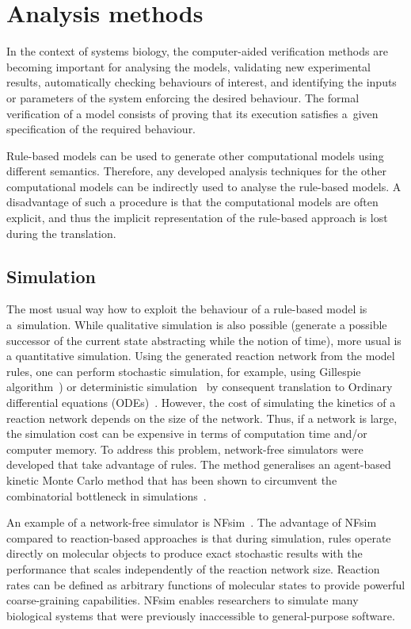 \documentclass[11pt,a4paper]{report}
\begin{document}
\section{Analysis methods}\label{analysis_sec}

In the context of systems biology, the computer-aided verification methods are becoming important for analysing the models, validating new experimental results, automatically checking behaviours of interest, and identifying the inputs or parameters of the system enforcing the desired behaviour. The formal verification of a model consists of proving that its execution satisfies a~given specification of the required behaviour.

Rule-based models can be used to generate other computational models using different semantics. Therefore, any developed analysis techniques for the other computational models can be indirectly used to analyse the rule-based models. A disadvantage of such a procedure is that the computational models are often explicit, and thus the implicit representation of the rule-based approach is lost during the translation. 

\subsection{Simulation}

The most usual way how to exploit the behaviour of a rule-based model is a~simulation. While qualitative simulation is also possible (generate a possible successor of the current state abstracting while the notion of time), more usual is a quantitative simulation. Using the generated reaction network from the model rules, one can perform stochastic simulation, for example, using Gillespie algorithm~\cite{GILLESPIE1976403}) or deterministic simulation~\cite{Poole2000} by consequent translation to Ordinary differential equations (ODEs)~\cite{higham2008modeling}. However, the cost of simulating the kinetics of a reaction network depends on the size of the network. Thus, if a network is large, the simulation cost can be expensive in terms of computation time and/or computer memory. To address this problem, network-free simulators were developed that take advantage of rules. The method generalises an agent-based kinetic Monte Carlo method that has been shown to circumvent the combinatorial bottleneck in simulations~\cite{yang2008kinetic}.

An example of a network-free simulator is NFsim~\cite{sneddon2011efficient}. The advantage of NFsim compared to reaction-based approaches is that during simulation, rules operate directly on molecular objects to produce exact stochastic results with the performance that scales independently of the reaction network size. Reaction rates can be defined as arbitrary functions of molecular states to provide powerful coarse-graining capabilities. NFsim enables researchers to simulate many biological systems that were previously inaccessible to general-purpose software.
\end{document}
